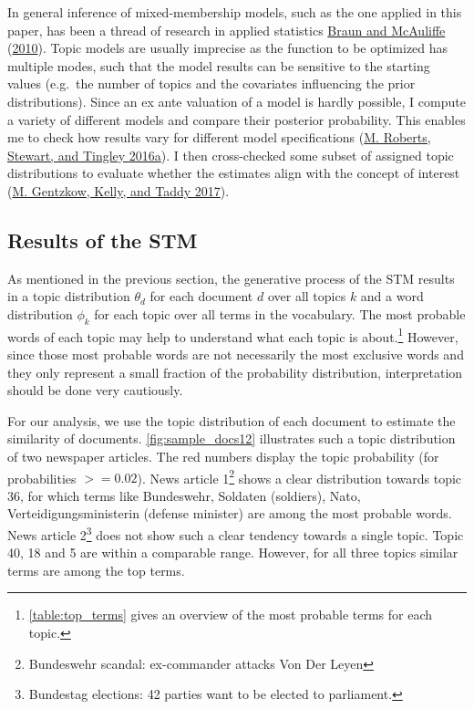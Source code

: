 \documentclass[
]{article}
\begin{document}
In general inference of mixed-membership models, such as the one applied
in this paper, has been a thread of research in applied statistics
\protect\hyperlink{ref-braun_variational_2010}{Braun and McAuliffe}
(\protect\hyperlink{ref-braun_variational_2010}{2010}). Topic models are
usually imprecise as the function to be optimized has multiple modes,
such that the model results can be sensitive to the starting values
(e.g.~the number of topics and the covariates influencing the prior
distributions). Since an ex ante valuation of a model is hardly
possible, I compute a variety of different models and compare their
posterior probability. This enables me to check how results vary for
different model specifications
(\protect\hyperlink{ref-roberts_navigating_2016}{M. Roberts, Stewart,
and Tingley 2016a}). I then cross-checked some subset of assigned topic
distributions to evaluate whether the estimates align with the concept
of interest (\protect\hyperlink{ref-gentzkow_text_2017}{M. Gentzkow,
Kelly, and Taddy 2017}).

\hypertarget{results-of-the-stm}{%
\subsection{Results of the STM}\label{results-of-the-stm}}

As mentioned in the previous section, the generative process of the STM
results in a topic distribution \(\theta_d\) for each document \(d\)
over all topics \(k\) and a word distribution \(\phi_k\) for each topic
over all terms in the vocabulary. The most probable words of each topic
may help to understand what each topic is about.\footnote{\autoref{table:top_terms}
  gives an overview of the most probable terms for each topic.} However,
since those most probable words are not necessarily the most exclusive
words and they only represent a small fraction of the probability
distribution, interpretation should be done very cautiously.

For our analysis, we use the topic distribution of each document to
estimate the similarity of documents. \autoref{fig:sample_docs12}
illustrates such a topic distribution of two newspaper articles. The red
numbers display the topic probability (for probabilities \(>= 0.02\)).
News article 1\footnote{Bundeswehr scandal: ex-commander attacks Von Der
  Leyen} shows a clear distribution towards topic 36, for which terms
like Bundeswehr, Soldaten (soldiers), Nato, Verteidigungsministerin
(defense minister) are among the most probable words. News article
2\footnote{Bundestag elections: 42 parties want to be elected to
  parliament.} does not show such a clear tendency towards a single
topic. Topic 40, 18 and 5 are within a comparable range. However, for
all three topics similar terms are among the top terms.
\end{document}
